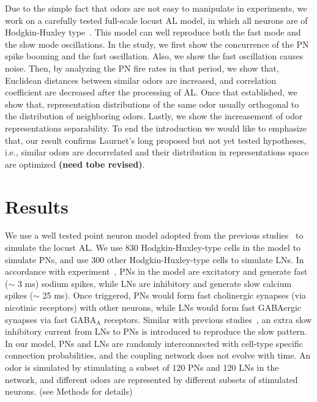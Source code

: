 \documentclass[12pt, a4paper]{article}
\begin{document}
Due to the simple fact that odors are not easy to manipulate in experiments, we work on a carefully tested full-scale locust AL model, in which all neurons are of Hodgkin-Huxley type~\citep{Patel2009, Patel2013}. This model can well reproduce both the fast mode and the slow mode oscillations. In the study, we first show the concurrence of the PN spike booming and the fast oscillation. Also, we show the fast oscillation causes noise. Then, by analyzing the PN fire rates in that period, we show that, Euclidean distances between similar odors are increased, and correlation coefficient are decreased after the processing of AL. Once that established, we show that, representation distributions of the same odor usually orthogonal to the distribution of neighboring odors. Lastly, we show the increasement of odor representations separability. To end the introduction we would like to emphasize that, our result confirms Laurnet's long proposed but not yet tested hypotheses, i.e., similar odors are decorrelated and their distribution in representations space are optimized {\bf (need tobe revised)}.


\section{Results}


We use a well tested point neuron model adopted from the previous studies~\citep{} to simulate the locust AL. We use 830 Hodgkin-Huxley-type cells in the model to simulate PNs, and use 300 other Hodgkin-Huxley-type cells to simulate LNs. In accordance with experiment~\citep{}, PNs in the model are excitatory and generate fast ($\sim$ 3 ms) sodium spikes, while LNs are inhibitory and generate slow calcium spikes ($\sim$ 25 ms). Once triggered, PNs would form fast cholinergic synapses (via nicotinic receptors) with other neurons, while LNs would form fast GABAergic synapses via fast GABA$_{\mbox{A}}$ receptors. Similar with previous studies~\citep{}, an extra slow inhibitory current from LNs to PNs is introduced to reproduce the slow pattern.
In our model, PNs and LNs are randomly interconnected with cell-type specific connection probabilities, %
and the coupling network does not evolve with time.
An odor is simulated by stimulating a subset of 120 PNs and 120 LNs in the network, and different odors are represented by different subsets of stimulated neurons. (see Methods for details)
\end{document}
